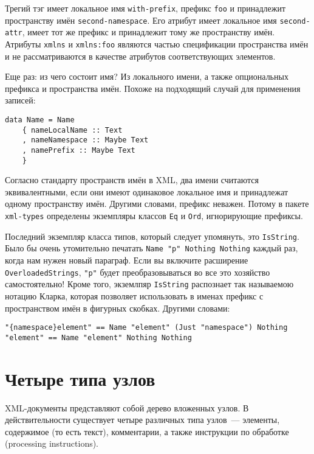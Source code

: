 Трегий тэг имеет локальное имя \lstinline!with-prefix!, префикс \lstinline!foo! и принадлежит пространству имён \lstinline!second-namespace!. Его атрибут имеет локальное имя \lstinline!second-attr!, имеет тот же префикс и принадлежит тому же пространству имён. Атрибуты \lstinline!xmlns! и \lstinline!xmlns:foo! являются частью спецификации пространства имён и не рассматриваются в качестве атрибутов соответствующих элементов.

Еще раз: из чего состоит имя? Из локального имени, а также опциональных префикса и пространства имён. Похоже на подходящий случай для применения записей:

\begin{lstlisting}
data Name = Name
    { nameLocalName :: Text
    , nameNamespace :: Maybe Text
    , namePrefix :: Maybe Text
    }
\end{lstlisting}

Согласно стандарту пространств имён в XML, два имени считаются эквивалентными, если они имеют одинаковое локальное имя и принадлежат одному пространству имён. Другими словами, префикс неважен. Потому в пакете \lstinline!xml-types! определены экземпляры классов \lstinline!Eq! и \lstinline!Ord!, игнорирующие префиксы.

Последний экземпляр класса типов, который следует упомянуть, это \lstinline!IsString!. Было бы очень утомительно печатать \lstinline!Name "p" Nothing Nothing! каждый раз, когда нам нужен новый параграф. Если вы включите расширение \lstinline!OverloadedStrings!, \lstinline!"p"! будет преобразовываться во все это хозяйство самостоятельно! Кроме того, экземлпяр \lstinline!IsString! распознает так называемою нотацию Кларка, которая позволяет использовать в именах префикс с пространством имён в фигурных скобках. Другими словами:

\begin{lstlisting}
"{namespace}element" == Name "element" (Just "namespace") Nothing
"element" == Name "element" Nothing Nothing
\end{lstlisting}

\section{Четыре типа узлов} %

XML-документы представляют собой дерево вложенных узлов. В действительности существует четыре различных типа узлов~--- элементы, содержимое (то есть текст), комментарии, а также инструкции по обработке (processing instructions).

